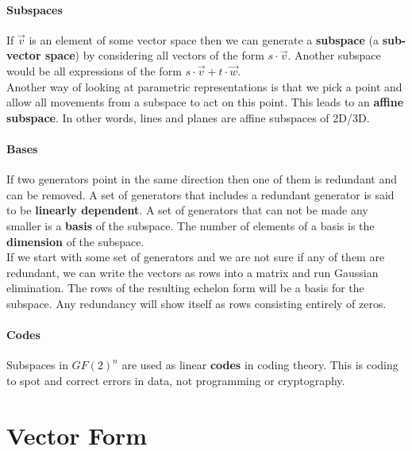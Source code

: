 \documentclass{article}
\begin{document}
\paragraph{Subspaces}
If $\vec{v}$ is an element of some vector space then we can generate a \textbf{subspace} (a \textbf{sub-vector space}) by considering all vectors of the form $s\cdot \vec{v}$. Another subspace would be all expressions of the form $s\cdot \vec{v} + t\cdot \vec{w}$.
\vspace{1mm}\\
Another way of looking at parametric representations is that we pick a point and allow all movements from a subspace to act on this point. This leads to an \textbf{affine subspace}. In other words, lines and planes are affine subspaces of 2D/3D.

\paragraph{Bases}
If two generators point in the same direction then one of them is redundant and can be removed. A set of generators that includes a redundant generator is said to be \textbf{linearly dependent}. A set of generators that can not be made any smaller is a \textbf{basis} of the subspace. The number of elements of a basis is the \textbf{dimension} of the subspace.
\vspace{1mm}\\
If we start with some set of generators and we are not sure if any of them are redundant, we can write the vectors as rows into a matrix and run Gaussian elimination. The rows of the resulting echelon form will be a basis for the subspace. Any redundancy will show itself as rows consisting entirely of zeros.

\paragraph{Codes}
Subspaces in $GF(2)^n$ are used as linear \textbf{codes} in coding theory. This is coding to spot and correct errors in data, not programming or cryptography.

\section{Vector Form}
\end{document}
